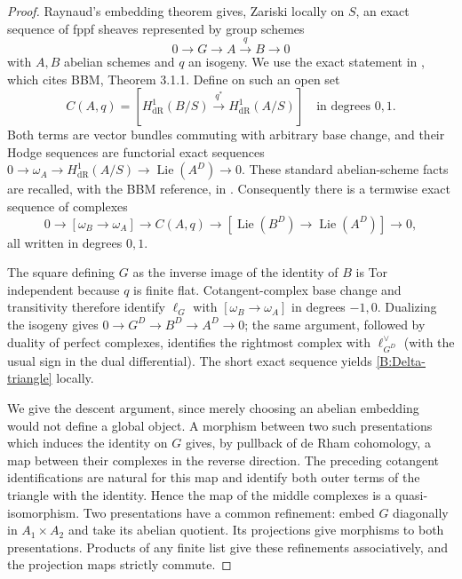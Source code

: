 \begin{proof}
Raynaud's embedding theorem gives, Zariski locally on $S$, an exact
sequence of fppf sheaves represented by group schemes
\[
 0\longrightarrow G\longrightarrow A\xrightarrow{q}B\longrightarrow0
\]
with $A,B$ abelian schemes and $q$ an isogeny. We use the exact
statement in \cite[Theorem 4.65]{B:ALB}, which cites BBM, Theorem
3.1.1. Define on such an open set
\begin{equation}\label{B:Delta-resolution}
 C(A,q)=
 [H^1_{\mathrm{dR}}(B/S)\xrightarrow{q^*}
  H^1_{\mathrm{dR}}(A/S)]
 \quad\text{in degrees }0,1.
\end{equation}
Both terms are vector bundles commuting with arbitrary base change,
and their Hodge sequences are functorial exact sequences
$0\to\omega_A\to H^1_{\mathrm{dR}}(A/S)\to
\operatorname{Lie}(A^D)\to0$.
These standard abelian-scheme facts are recalled, with the BBM
reference, in \cite[Proposition 4.57]{B:ALB}.
Consequently there is a termwise exact sequence of complexes
\[
 0\to[\omega_B\to\omega_A]\to C(A,q)
 \to[\operatorname{Lie}(B^D)\to\operatorname{Lie}(A^D)]\to0,
\]
all written in degrees $0,1$.

The square defining $G$ as the inverse image of the identity of $B$
is Tor independent because $q$ is finite flat. Cotangent-complex
base change and transitivity therefore identify
$\ell_G$ with $[\omega_B\to\omega_A]$ in degrees $-1,0$.
Dualizing the isogeny gives
$0\to G^D\to B^D\to A^D\to0$; the same argument, followed by
duality of perfect complexes, identifies the rightmost complex
with $\ell_{G^D}^{\vee}$ (with the usual sign in the dual
differential). The short exact sequence yields
\eqref{B:Delta-triangle} locally.

We give the descent argument, since merely choosing an abelian
embedding would not define a global object. A morphism between
two such presentations which induces the identity on $G$ gives,
by pullback of de Rham cohomology, a map between their complexes
in the reverse direction. The preceding cotangent identifications
are natural for this map and identify both outer terms of the
triangle with the identity. Hence the map of the middle complexes
is a quasi-isomorphism. Two presentations have a common refinement:
embed $G$ diagonally in $A_1\times A_2$ and take its abelian
quotient. Its projections give morphisms to both presentations.
Products of any finite list give these refinements associatively,
and the projection maps strictly commute.


\end{proof}
